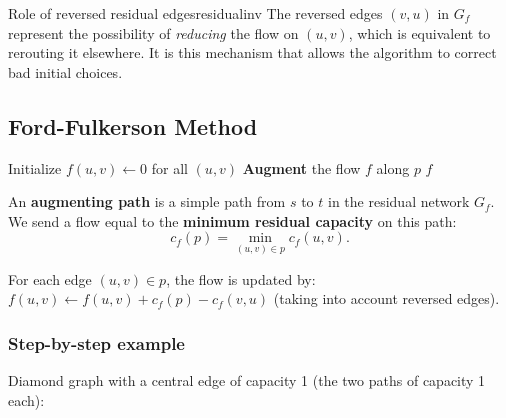 \begin{remark}{Role of reversed residual edges}{residualinv}
The reversed edges $(v,u)$ in $G_f$ represent the possibility of
\emph{reducing} the flow on $(u,v)$, which is equivalent to rerouting it elsewhere.
It is this mechanism that allows the algorithm to correct bad initial choices.
\end{remark}

\subsection{Ford-Fulkerson Method}

\begin{algorithm}[H]
\caption{Ford-Fulkerson-Method($G$, $s$, $t$)}
\begin{algorithmic}[1]
\State Initialize $f(u,v) \leftarrow 0$ for all $(u,v)$
    \State \textbf{Augment} the flow $f$ along $p$
\EndWhile
\State \Return $f$
\end{algorithmic}
\end{algorithm}

An \textbf{augmenting path} is a simple path from $s$ to $t$ in the residual
network $G_f$. We send a flow equal to the \textbf{minimum residual capacity}
on this path:
\[
  c_f(p) = \min_{(u,v) \in p} c_f(u,v).
\]

For each edge $(u,v) \in p$, the flow is updated by:
$f(u,v) \leftarrow f(u,v) + c_f(p) - c_f(v,u)$ (taking into account reversed 
edges).

\subsubsection{Step-by-step example}

Diamond graph with a central edge of capacity 1 (the two paths of capacity 1
each):

